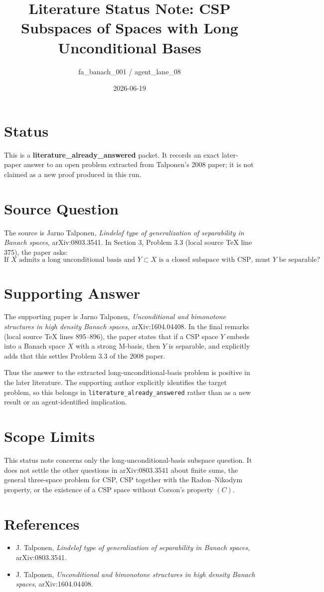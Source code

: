 \documentclass[11pt]{article}
\title{Literature Status Note: CSP Subspaces of Spaces with Long Unconditional Bases}
\author{fa\_banach\_001 / agent\_lane\_08}
\date{2026-06-19}
\begin{document}
\maketitle

\section*{Status}

This is a \textbf{literature\_already\_answered} packet.  It records an exact
later-paper answer to an open problem extracted from Talponen's 2008 paper; it
is not claimed as a new proof produced in this run.

\section*{Source Question}

The source is Jarno Talponen, \emph{Lindelof type of generalization of
separability in Banach spaces}, arXiv:0803.3541.  In Section 3, Problem 3.3
(local source TeX line 375), the paper asks:
\[
\text{If } X \text{ admits a long unconditional basis and } Y\subset X
\text{ is a closed subspace with CSP, must } Y \text{ be separable?}
\]

\section*{Supporting Answer}

The supporting paper is Jarno Talponen, \emph{Unconditional and bimonotone
structures in high density Banach spaces}, arXiv:1604.04408.  In the final
remarks (local source TeX lines 895--896), the paper states that if a CSP space
\(Y\) embeds into a Banach space \(X\) with a strong M-basis, then \(Y\) is
separable, and explicitly adds that this settles Problem 3.3 of the 2008
paper.

Thus the answer to the extracted long-unconditional-basis problem is positive
in the later literature.  The supporting author explicitly identifies the
target problem, so this belongs in \texttt{literature\_already\_answered}
rather than as a new result or an agent-identified implication.

\section*{Scope Limits}

This status note concerns only the long-unconditional-basis subspace question.
It does not settle the other questions in arXiv:0803.3541 about finite sums,
the general three-space problem for CSP, CSP together with the Radon--Nikodym
property, or the existence of a CSP space without Corson's property \((C)\).

\section*{References}

\begin{itemize}
\item J. Talponen, \emph{Lindelof type of generalization of separability in
Banach spaces}, arXiv:0803.3541.
\item J. Talponen, \emph{Unconditional and bimonotone structures in high
density Banach spaces}, arXiv:1604.04408.
\end{itemize}
\end{document}
